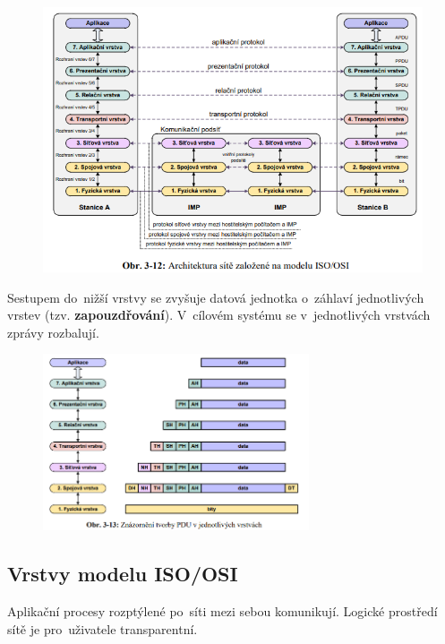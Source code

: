 \begin{figure}[ht]
	\centering
	\includegraphics[width=\textwidth]{images/q02_iso_osi}
\end{figure}

Sestupem do~nižší vrstvy se zvyšuje datová jednotka o~záhlaví jednotlivých vrstev (tzv. \textbf{zapouzdřování}). V~cílovém systému se v~jednotlivých vrstvách zprávy rozbalují.

\begin{figure}[ht]
	\centering
	\includegraphics[width=0.7\textwidth]{images/q02_iso_osi_pdu}
\end{figure}

\subsection{Vrstvy modelu ISO/OSI}

Aplikační procesy rozptýlené po~síti mezi sebou komunikují. Logické prostředí sítě je pro~uživatele transparentní.

